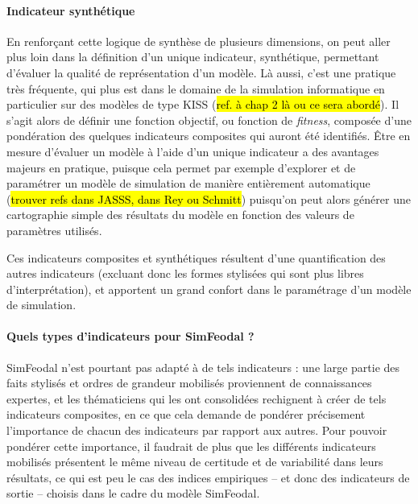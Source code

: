 \paragraph{Indicateur synthétique}

En renforçant cette logique de synthèse de plusieurs dimensions, on peut aller plus loin dans la définition d'un unique indicateur, synthétique, permettant d'évaluer la qualité de représentation d'un modèle.
Là aussi, c'est une pratique très fréquente, qui plus est dans le domaine de la simulation informatique en particulier sur des modèles de type \og KISS\fg{} (\hl{ref. à chap 2 là ou ce sera abordé}).
Il s'agit alors de définir une \og fonction objectif\fg{}, ou \og fonction de \textit{fitness}\fg{}, composée d'une pondération des quelques indicateurs composites qui auront été identifiés.
Être en mesure d'évaluer un modèle à l'aide d'un unique indicateur a des avantages majeurs en pratique, puisque cela permet par exemple d'explorer et de paramétrer un modèle de simulation de manière entièrement automatique (\hl{trouver refs dans JASSS, dans Rey ou Schmitt}) puisqu'on peut alors générer une cartographie simple des résultats du modèle en fonction des valeurs de paramètres utilisés.

Ces indicateurs composites et synthétiques résultent d'une quantification des autres indicateurs (excluant donc les formes stylisées qui sont plus libres d'interprétation), et apportent un grand confort dans le paramétrage d'un modèle de simulation.

\paragraph{Quels types d'indicateurs pour SimFeodal ?}

SimFeodal n'est pourtant pas adapté à de tels indicateurs :
une large partie des faits stylisés et ordres de grandeur mobilisés proviennent de connaissances expertes, et les thématiciens qui les ont consolidées rechignent à créer de tels indicateurs composites, en ce que cela demande de pondérer précisement l'importance de chacun des indicateurs par rapport aux autres.
Pour pouvoir pondérer cette importance, il faudrait de plus que les différents indicateurs mobilisés présentent le même niveau de certitude et de variabilité dans leurs résultats, ce qui est peu le cas des indices empiriques -- et donc des indicateurs de sortie -- choisis dans le cadre du modèle SimFeodal.

